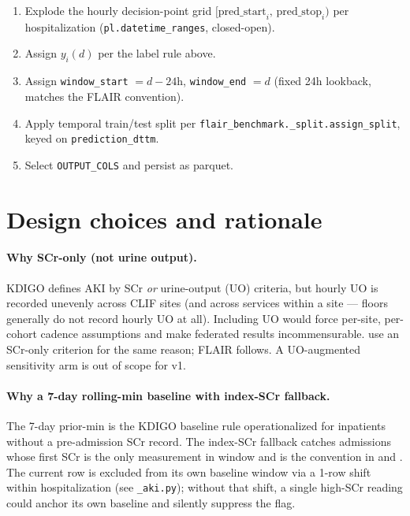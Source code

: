 \documentclass[11pt]{article}
\newcommand{\predstart}{\text{pred\_start}}
\newcommand{\predstop}{\text{pred\_stop}}
\begin{document}
\begin{enumerate}[leftmargin=2em]
  \item Explode the hourly decision-point grid
        $[\predstart_i,\, \predstop_i)$ per hospitalization
        (\verb|pl.datetime_ranges|, closed-open).
  \item Assign $y_i(d)$ per the label rule above.
  \item Assign \texttt{window\_start} $= d - 24$h,
        \texttt{window\_end} $= d$ (fixed 24h lookback, matches the
        FLAIR convention).
  \item Apply temporal train/test split per
        \texttt{flair\_benchmark.\_split.assign\_split}, keyed on
        \texttt{prediction\_dttm}.
  \item Select \texttt{OUTPUT\_COLS} and persist as parquet.
\end{enumerate}

\section{Design choices and rationale}
\label{sec:rationale}

\paragraph{Why SCr-only (not urine output).}
KDIGO defines AKI by SCr \emph{or} urine-output (UO) criteria, but
hourly UO is recorded unevenly across CLIF sites (and across services
within a site --- floors generally do not record hourly UO at all).
Including UO would force per-site, per-cohort cadence assumptions and
make federated results incommensurable. \citet{koyner2018aki} use an
SCr-only criterion for the same reason; FLAIR follows. A UO-augmented
sensitivity arm is out of scope for v1.

\paragraph{Why a 7-day rolling-min baseline with index-SCr fallback.}
The 7-day prior-min is the KDIGO baseline rule operationalized for
inpatients without a pre-admission SCr record. The index-SCr fallback
catches admissions whose first SCr is the only measurement in window
and is the convention in \citet{koyner2018aki} and
\citet{tomasev2019aki}. The current row is excluded from its own
baseline window via a 1-row shift within hospitalization (see
\texttt{\_aki.py}); without that shift, a single high-SCr reading
could anchor its own baseline and silently suppress the flag.
\end{document}
